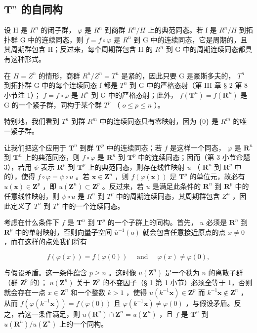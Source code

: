 \subsection{\texorpdfstring{\(\mathbf{T}^n\) 的自同构}{T 的 n 次幂的自同构}}

设 H 是 \(R^{n}\) 的闭子群， \(\varphi\) 是 \(R^{n}\) 到商群 \(R^{n}/H\) 上的典范同态。若 f 是 \(R^{n}/H\) 到拓扑群 G 中的连续同态，则 \(\dot{f} = f \circ \varphi\) 是 \(R^{n}\) 到 G 中的连续同态，它是周期的，且其周期群包含 H；反过来，每个周期群包含 H 的 \(R^{n}\) 到 G 中的周期连续同态都具有这种形式。

在 \(H = Z^{n}\) 的情形，商群 \(R^{n}/Z^{n} = T^{n}\) 是紧的，因此只要 G 是豪斯多夫的， \(T^{n}\) 到拓扑群 G 中的每个连续同态 f 都是 \(T^{n}\) 到 G 中的严格态射（第 III 章 § 2 第 8 小节注 1）； \(\dot{f} = f \circ \varphi\) 是 \(R^{n}\) 到 G 中的严格态射；此外， \(f(\mathbf{T}^{n}) = \dot{f}(\mathbf{R}^{n})\) 是 G 的一个紧子群，同构于某个群 \(T^{p}\) （ \(o \leqslant p \leqslant n\) ）。

特别地，我们看到 \(T^{n}\) 到群 \(R^{m}\) 中的连续同态只有零映射，因为 \(\{0\}\) 是 \(R^{m}\) 的唯一紧子群。

让我们把这个应用于 \(\mathbf{T}^n\) 到群 \(\mathbf{T}^p\) 中的连续同态；若 \(f\) 是这样一个同态， \(\varphi\) 是 \(\mathbf{R}^n\) 到 \(\mathbf{T}^n\) 上的典范同态，则 \(f \circ \varphi\) 是 \(\mathbf{R}^n\) 到 \(\mathbf{T}^p\) 中的连续同态；因而（第 3 小节命题 3），若用 \(\psi\) 表示 \(\mathbf{R}^p\) 到 \(\mathbf{T}^p\) 上的典范同态，则存在线性映射 \(u\) （ \(\mathbf{R}^n\) 到 \(\mathbf{R}^p\) 中的），使得 \(f \circ \varphi = \psi \circ u\) 。若 \(\boldsymbol{x} \in \mathbf{Z}^n\) ，则 \(f(\varphi(\boldsymbol{x}))\) 是 \(\mathbf{T}^p\) 的单位元，故必有 \(u(\boldsymbol{x}) \in \mathbf{Z}^p\) ，即 \(u(\mathbf{Z}^n) \subset \mathbf{Z}^p\) 。反过来，若 \(u\) 是满足此条件的 \(\mathbf{R}^n\) 到 \(\mathbf{R}^p\) 中的任意线性映射，则 \(\psi \circ u\) 是 \(R^n\) 到 \(T^p\) 中的周期连续同态，其周期群包含 \(Z^n\) ，因此定义了 \(T^n\) 到 \(T^p\) 中的一个连续同态。

考虑在什么条件下 \(f\) 是 \(\mathbf{T}^n\) 到 \(\mathbf{T}^p\) 的一个子群上的同构。首先， \(u\) 必须是 \(\mathbf{R}^n\) 到 \(\mathbf{R}^p\) 中的单射映射，否则向量子空间 \(\overline{u}^{-1}(\mathrm{o})\) 就会包含任意接近原点的点 \(x \neq 0\) ，而在这样的点处我们将有

\[
f (\varphi (x)) = f (\varphi (0)) \quad \text { and } \quad \varphi (x) \neq \varphi (0),
\]

与假设矛盾。这一条件蕴含 \(p \geqslant n\) 。这时像 \(u(\mathbf{Z}^n)\) 是一个秩为 \(n\) 的离散子群（群 \(\mathbf{Z}^p\) 的）； \(u(\mathbf{Z}^n)\) 关于 \(\mathbf{Z}^p\) 的不变因子（§ 1 第 1 小节）必须全等于 1，否则就会存在一点 \(x \in \mathbf{Z}^n\) 和一个整数 \(k > 1\) ，使得 \(u(k^{-1}\mathbf{x}) \in \mathbf{Z}^p\) 而 \(k^{-1}\mathbf{x} \notin \mathbf{Z}^n\) ，从而 \(f(\varphi(k^{-1}\mathbf{x})) = f(\varphi(0))\) 且 \(\varphi(k^{-1}\mathbf{x}) \neq \varphi(0)\) ，与假设矛盾。反之，若这一条件满足，则 \(u(\mathbf{R}^n) \cap \mathbf{Z}^n = u(\mathbf{Z}^n)\) ，且 \(f\) 是 \(\mathbf{T}^n\) 到 \(u(\mathbf{R}^n)/u(\mathbf{Z}^n)\) 上的一个同构。

